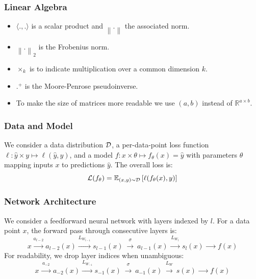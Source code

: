 \subsubsection{Linear Algebra}

\begin{itemize}
\item
  \(\langle.,.\rangle\) is a scalar product and \(\left\| . \right\|\)
  the associated norm.
\item
  \(\left\| . \right\|_{2}\) is the Frobenius norm.
\item
  \(\times_{k}\) is to indicate multiplication over a common dimension
  \(k\).
\item
  \(.^{+}\) is the Moore-Penrose pseudoinverse.
  \item To make the size of matrices more readable we use $(a, b)$ instead of $\mathbb{R}^{a \times b}$.
\end{itemize}

\subsubsection{Data and Model}

We consider a data distribution \(\mathcal{D}\), a per-data-point loss function
\(\ell:\hat{y} \times y \mapsto \ell(\hat{y},y)\), and a model
\(f:x \times \theta \mapsto f_{\theta}(x) = \hat{y}\) with parameters
\(\theta\) mapping inputs \(x\) to predictions \(\hat{y}\). The overall
loss is:
\[
    \mathcal{L}(f_{\theta}) = \mathbb{E}_{(x,y) \sim \mathcal{D}}\left\lbrack \ell(f_{\theta}(x),y) \right\rbrack
\]

\subsubsection{Network Architecture}

We consider a feedforward neural network with layers indexed by \(l\).
For a data point \(x\), the forward pass through consecutive layers is:
\[
    x \overset{a_{l - 2}}{\xrightarrow{\hspace{2em}}} a_{l - 2}(x) \overset{L_{W_{l - 1}}}{\xrightarrow{\hspace{2em}}} s_{l - 1}(x) \overset{\sigma}{\xrightarrow{\hspace{2em}}} a_{l - 1}(x) \overset{L_{W_{l}}}{\xrightarrow{\hspace{2em}}} s_{l}(x) \overset{\hspace{2em}}{\xrightarrow{\hspace{2em}}} f(x)
\]
For readability, we drop layer indices when unambiguous:
\[
    x \overset{a_{- 2}}{\xrightarrow{\hspace{2em}}} a_{- 2}(x) \overset{L_{W_{- 1}}}{\xrightarrow{\hspace{2em}}} s_{- 1}(x) \overset{\sigma}{\xrightarrow{\hspace{2em}}} a_{- 1}(x) \overset{L_{W}}{\xrightarrow{\hspace{2em}}} s(x) \xrightarrow{\hspace{2em}} f(x)
\]

